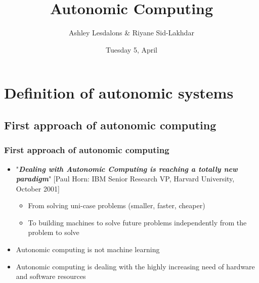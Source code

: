 \documentclass[11pt]{beamer}
\author{Ashley Lesdalons \& Riyane Sid-Lakhdar}
\title{Autonomic Computing}
\institute{Adaptive Computing Systems}
\date{Tuesday 5, April}
\begin{document}
	\maketitle

    
    \section{Definition of autonomic systems}
    \subsection{First approach of autonomic computing}
	\begin{frame}
		\frametitle{First approach of autonomic computing}
		\begin{center}
			\begin{itemize}
				\item "\textbf{\textit{Dealing with Autonomic Computing is reaching a totally new paradigm}}" [Paul Horn: IBM Senior Research VP, Harvard University, October 2001]
					\begin{itemize}
                    	\item From solving uni-case problems (smaller, faster, cheaper)
                        \item To building machines to solve future problems independently from the problem to solve
                    \end{itemize}

				\item Autonomic computing is not machine learning 

				\item Autonomic computing is dealing with the highly increasing need of hardware and software resources
			\end{itemize}
		\end{center}
	\end{frame}
\end{document}
